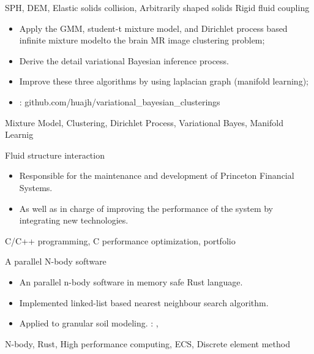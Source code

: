 \begin{experiences}
{                    }
                    {SPH, DEM, Elastic solids collision, Arbitrarily shaped solids}
  \emptySeparator
  \experience
  {} {Rigid fluid coupling}{}{}
  {}    {
                    \begin{itemize}
                        \item Apply the GMM, student-t mixture model, and Dirichlet process based infinite mixture modelto the brain MR image clustering problem;
                        \item Derive the detail variational Bayesian inference process.
                        \item Improve these three algorithms by using laplacian graph (manifold learning);
                        \item \faGithub:  {github.com/huajh/variational\_bayesian\_clusterings}
                    \end{itemize}
                  }
                  {Mixture Model, Clustering, Dirichlet Process, Variational Bayes, Manifold Learnig}

  \emptySeparator
  \experience
  {} {Fluid structure interaction}{}{}
  {}    {
    \begin{itemize}
        \item  Responsible for the maintenance and development of Princeton Financial Systems.
        \item As well as in charge of improving the performance of the system by integrating new technologies.
    \end{itemize}
  }
  {C/C++ programming, C performance optimization, portfolio}


  \emptySeparator
  \experience
  {} {A parallel N-body software}{}{}
  {}    {
    \begin{itemize}
      \item An parallel n-body software in memory safe Rust language.
      \item Implemented linked-list based nearest neighbour search algorithm.
      \item Applied to granular soil modeling.
        \faGithub: ,
    \end{itemize}
  }
  {N-body, Rust, High performance computing, ECS, Discrete element method}


\end{experiences}
